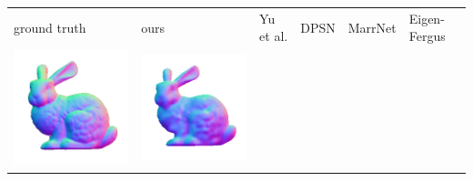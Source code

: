 \begin{tabularx}{\linewidth}{@{}Y@{}Y@{}Y@{}Y@{}Y@{}Y@{}}
ground truth & ours & Yu et al. & DPSN & MarrNet & Eigen-Fergus \\
\includegraphics[width=\linewidth]{semisynthetic/20160617_14_gt.png} &
\includegraphics[width=\linewidth]{semisynthetic/20160617_14_ours_out.png} &

\end{tabularx}
